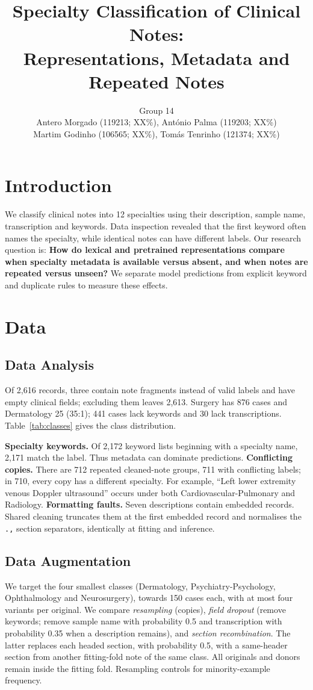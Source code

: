 \documentclass[twocolumn,10pt]{article}
\title{Specialty Classification of Clinical Notes:\\Representations, Metadata and Repeated Notes}
\author{Group 14\\
Antero Morgado (119213; XX\%), António Palma (119203; XX\%)\\
Martim Godinho (106565; XX\%), Tomás Tenrinho (121374; XX\%)}
\date{}
\begin{document}
\maketitle

\section{Introduction}
We classify clinical notes into 12 specialties using their description, sample name, transcription and keywords. Data inspection revealed that the first keyword often names the specialty, while identical notes can have different labels. Our research question is: \textbf{How do lexical and pretrained representations compare when specialty metadata is available versus absent, and when notes are repeated versus unseen?} We separate model predictions from explicit keyword and duplicate rules to measure these effects. 

\section{Data}
\subsection{Data Analysis}
Of 2,616 records, three contain note fragments instead of valid labels and have empty clinical fields; excluding them leaves 2,613. Surgery has 876 cases and Dermatology 25 (35:1); 441 cases lack keywords and 30 lack transcriptions. Table~\ref{tab:classes} gives the class distribution.

\textbf{Specialty keywords.} Of 2,172 keyword lists beginning with a specialty name, 2,171 match the label. Thus metadata can dominate predictions.
\textbf{Conflicting copies.} There are 712 repeated cleaned-note groups, 711 with conflicting labels; in 710, every copy has a different specialty. For example, ``Left lower extremity venous Doppler ultrasound'' occurs under both Cardiovascular-Pulmonary and Radiology.
\textbf{Formatting faults.} Seven descriptions contain embedded records. Shared cleaning truncates them at the first embedded record and normalises the \texttt{.,} section separators, identically at fitting and inference.

\subsection{Data Augmentation}
We target the four smallest classes (Dermatology, Psychiatry-Psychology, Ophthalmology and Neurosurgery), towards 150 cases each, with at most four variants per original. We compare \emph{resampling} (copies), \emph{field dropout} (remove keywords; remove sample name with probability 0.5 and transcription with probability 0.35 when a description remains), and \emph{section recombination}. The latter replaces each headed section, with probability 0.5, with a same-header section from another fitting-fold note of the same class. All originals and donors remain inside the fitting fold. Resampling controls for minority-example frequency.
\end{document}
